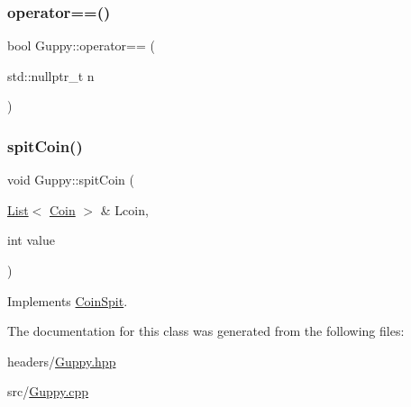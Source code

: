 \mbox{\label{class_guppy_a8b7c06fba5a291556cd4bf5255ac153e}} 
\subsubsection{\texorpdfstring{operator==()}{operator==()}\hspace{0.1cm}{\footnotesize\ttfamily [2/2]}}
{\footnotesize\ttfamily bool Guppy\+::operator== (\begin{DoxyParamCaption}\item[{std\+::nullptr\+\_\+t}]{n }\end{DoxyParamCaption})}

\mbox{\label{class_guppy_a39dfc2b44aed14f056bddcc08ff7c598}} 
\subsubsection{\texorpdfstring{spit\+Coin()}{spitCoin()}}
{\footnotesize\ttfamily void Guppy\+::spit\+Coin (\begin{DoxyParamCaption}\item[{\mbox{\hyperlink{class_list}{List}}$<$ \mbox{\hyperlink{class_coin}{Coin}} $>$ \&}]{Lcoin,  }\item[{int}]{value }\end{DoxyParamCaption})\hspace{0.3cm}{\ttfamily [virtual]}}



Implements \mbox{\hyperlink{class_coin_spit_a336f45a90c4b0b57017b45a5c68f12a7}{Coin\+Spit}}.



The documentation for this class was generated from the following files\+:\begin{DoxyCompactItemize}
\item 
headers/\mbox{\hyperlink{_guppy_8hpp}{Guppy.\+hpp}}\item 
src/\mbox{\hyperlink{_guppy_8cpp}{Guppy.\+cpp}}\end{DoxyCompactItemize}
